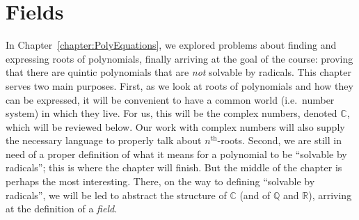 \chapter{Fields}
\label{chapter:Fields}
\thispagestyle{empty}


In Chapter~\ref{chapter:PolyEquations}, we explored problems about finding and expressing roots of polynomials, finally arriving at the goal of the course: proving that there are quintic polynomials that are \emph{not} solvable by radicals. This chapter serves two main purposes. First, as we look at roots of polynomials and how they can be expressed, it will be convenient to have a common world (i.e.~number system) in which they live. For us, this will be the complex numbers, denoted $\mathbb{C}$, which will be reviewed below. Our work with complex numbers will also supply the necessary language to properly talk about $n^{\text{th}}$-roots. Second, we are still in need of a proper definition of what it means for a polynomial to be ``solvable by radicals''; this is where the chapter will finish. But the middle of the chapter is perhaps the most interesting. There, on the way to defining ``solvable by radicals'', we will be led to abstract the structure of $\mathbb{C}$ (and of $\mathbb{Q}$ and $\mathbb{R}$), arriving at the definition of a \emph{field}. 

